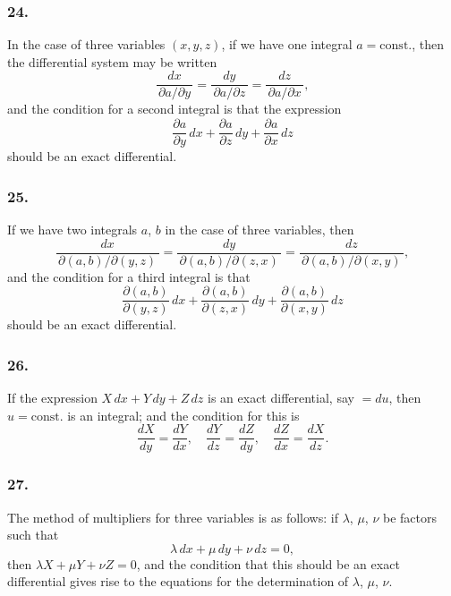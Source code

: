 \documentclass[11pt,a4paper]{book}
\begin{document}
\newpage
\setcounter{page}{123}

\subsubsection*{24.}

In the case of three variables $(x, y, z)$, if we have one integral $a = \text{const.}$, then the differential system may be written
\[
\frac{dx}{\,\partial a/\partial y\,} = \frac{dy}{\,\partial a/\partial z\,} = \frac{dz}{\,\partial a/\partial x\,},
\]
and the condition for a second integral is that the expression
\[
\frac{\partial a}{\partial y}\,dx + \frac{\partial a}{\partial z}\,dy + \frac{\partial a}{\partial x}\,dz
\]
should be an exact differential.

\subsubsection*{25.}

If we have two integrals $a$, $b$ in the case of three variables, then
\[
\frac{dx}{\,\partial(a, b)/\partial(y, z)\,} = \frac{dy}{\,\partial(a, b)/\partial(z, x)\,} = \frac{dz}{\,\partial(a, b)/\partial(x, y)\,},
\]
and the condition for a third integral is that
\[
\frac{\partial(a, b)}{\partial(y, z)}\,dx + \frac{\partial(a, b)}{\partial(z, x)}\,dy + \frac{\partial(a, b)}{\partial(x, y)}\,dz
\]
should be an exact differential.

\subsubsection*{26.}

If the expression $X\,dx + Y\,dy + Z\,dz$ is an exact differential, say $= du$, then $u = \text{const.}$ is an integral; and the condition for this is
\[
\frac{dX}{dy} = \frac{dY}{dx}, \quad \frac{dY}{dz} = \frac{dZ}{dy}, \quad \frac{dZ}{dx} = \frac{dX}{dz}.
\]

\subsubsection*{27.}

The method of multipliers for three variables is as follows: if $\lambda$, $\mu$, $\nu$ be factors such that
\[
\lambda\,dx + \mu\,dy + \nu\,dz = 0,
\]
then $\lambda X + \mu Y + \nu Z = 0$, and the condition that this should be an exact differential gives rise to the equations for the determination of $\lambda$, $\mu$, $\nu$.
\end{document}
